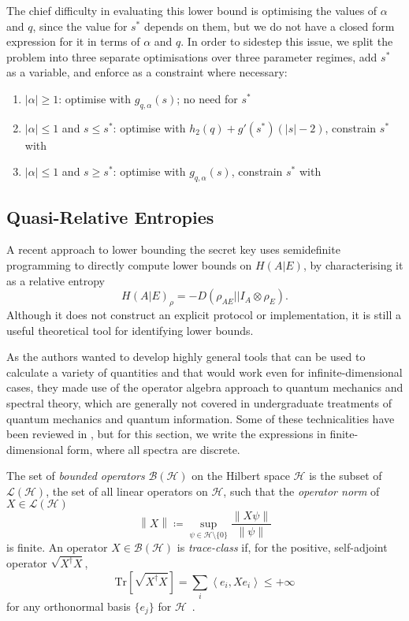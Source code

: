 \documentclass[10pt, a4paper]{article}
\numberwithin{equation}{section} %
\theoremstyle{definition}
\theoremstyle{plain}
\newcommand{\norm}[1]{\left\lVert#1\right\rVert}
\newcommand{\abs}[1]{\left\lvert#1\right\rvert}
\newcommand{\?}{\mathrel{?}} %
\newcommand{\angleb}[1]{\left\langle #1 \right\rangle} %
\newcommand{\Tr}{\mathrm{Tr}} %
\newcommand{\Hs}{\mathcal{H}} %
\begin{document}
    The chief difficulty in evaluating this lower bound is optimising the values of \(\alpha\) and \(q\), since the value for \(s^*\) depends on them, but we do not have a closed form expression for it in terms of \(\alpha\) and \(q\). In order to sidestep this issue, we split the problem into three separate optimisations over three parameter regimes, add \(s^*\) as a variable, and enforce  as a constraint where necessary:
    \begin{enumerate}
      \item \(\abs{\alpha} \geq 1\): optimise with \(g_{q,\alpha}(s)\); no need for \(s^*\)
      \item \(\abs{\alpha} \leq 1\) and \(s \leq s^*\): optimise with \(h_2(q) + g'(s^*)(\abs{s}-2)\), constrain \(s^*\) with 
      \item \(\abs{\alpha} \leq 1\) and \(s \geq s^*\): optimise with \(g_{q,\alpha}(s)\), constrain \(s^*\) with 
    \end{enumerate}

    \subsection{Quasi-Relative Entropies}

    A recent approach to lower bounding the secret key uses semidefinite programming to directly compute lower bounds on \(H(A|E)\), by characterising it as a relative entropy
    \begin{equation}
      H{(A|E)}_{\rho} = -D(\rho_{AE}||I_A \otimes \rho_{E}).
    \end{equation}
    Although it does not construct an explicit protocol or implementation, it is still a useful theoretical tool for identifying lower bounds.

    As the authors wanted to develop highly general tools that can be used to calculate a variety of quantities and that would work even for infinite-dimensional cases, they made use of the operator algebra approach to quantum mechanics and spectral theory, which are generally not covered in undergraduate treatments of quantum mechanics and quantum information. Some of these technicalities have been reviewed in , but for this section, we write the expressions in finite-dimensional form, where all spectra are discrete.

    The set of \emph{bounded operators} \(\mathcal{B}(\Hs)\) on the Hilbert space \(\Hs\) is the subset of \(\mathcal{L}(\Hs)\), the set of all linear operators on \(\Hs\), such that the \emph{operator norm} of \(X \in \mathcal{L}(\Hs)\)
      \[ \norm{X} \coloneqq \sup_{\psi \in \Hs \setminus \{0\}} \frac{\norm{X\psi}}{\norm{\psi}} \]
      is finite. An operator \(X \in \mathcal{B}(\Hs)\) is \emph{trace-class} if, for the positive, self-adjoint operator \(\sqrt{X^{\dagger}X}\),
      \[ \Tr\left[ \sqrt{X^{\dagger}X} \right] = \sum_{i} \angleb{e_i, Xe_i} \leq +\infty \]
      for any orthonormal basis \(\{e_j\}\) for \(\Hs\)~\cite{HallQuantumForMath}. 
\end{document}
